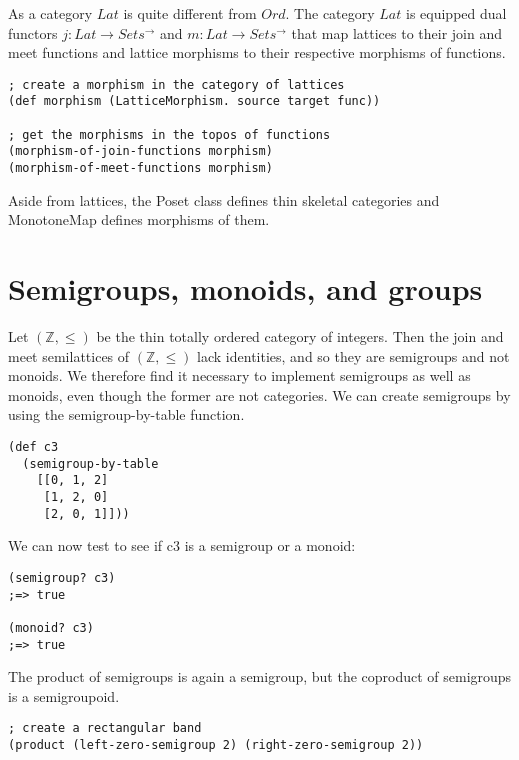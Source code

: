 \documentclass[a4paper,11pt]{report}
\begin{document}
As a category $Lat$ is quite different from $Ord$. The category $Lat$ is equipped dual functors $j : Lat \to Sets^{\to}$ and $m : Lat \to Sets^{\to}$ that map lattices to their join and meet functions and lattice morphisms to their respective morphisms of functions.

\lstset {language=Lisp}
\begin{lstlisting}
; create a morphism in the category of lattices
(def morphism (LatticeMorphism. source target func))

; get the morphisms in the topos of functions
(morphism-of-join-functions morphism)
(morphism-of-meet-functions morphism)
\end{lstlisting}

Aside from lattices, the Poset class defines thin skeletal categories and MonotoneMap defines morphisms of them.

\newpage 

\section{Semigroups, monoids, and groups}
Let $(\mathbb{Z},\leq)$ be the thin totally ordered category of integers. Then the join and meet semilattices of $(\mathbb{Z},\leq)$ lack identities, and so they are semigroups and not monoids. We therefore find it necessary to implement semigroups as well as monoids, even though the former are not categories. We can create semigroups by using the semigroup-by-table function.

\lstset {language=Lisp}
\begin{lstlisting}
(def c3 
  (semigroup-by-table 
    [[0, 1, 2]
     [1, 2, 0]
     [2, 0, 1]]))
\end{lstlisting}

We can now test to see if c3 is a semigroup or a monoid:

\lstset {language=Lisp}
\begin{lstlisting}
(semigroup? c3)
;=> true

(monoid? c3)
;=> true
\end{lstlisting}

The product of semigroups is again a semigroup, but the coproduct of semigroups is a semigroupoid. 

\lstset {language=Lisp}
\begin{lstlisting}
; create a rectangular band
(product (left-zero-semigroup 2) (right-zero-semigroup 2))
\end{lstlisting}
\end{document}
